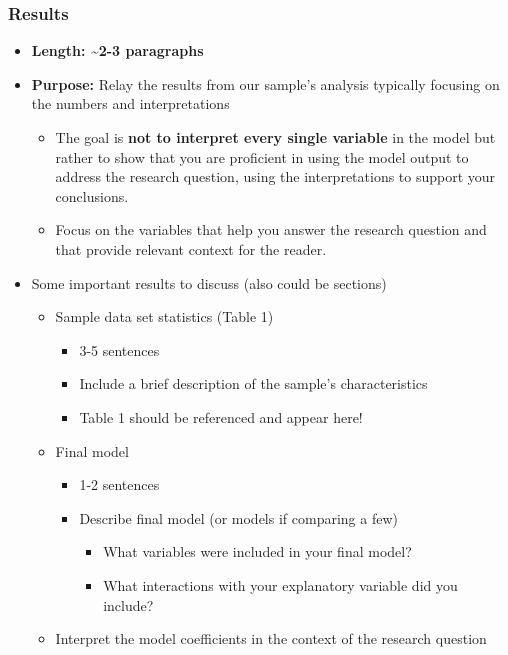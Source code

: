 \documentclass[
  letterpaper,
  DIV=11,
  numbers=noendperiod]{scrartcl}
\providecommand{\tightlist}{%
  \setlength{\itemsep}{0pt}\setlength{\parskip}{0pt}}\usepackage{longtable,booktabs,array}
\begin{document}
\subsubsection{Results}\label{results}

\begin{itemize}
\tightlist
\item
  \textbf{Length: \textasciitilde2-3 paragraphs}
\item
  \textbf{Purpose:} Relay the results from our sample's analysis
  typically focusing on the numbers and interpretations

  \begin{itemize}
  \tightlist
  \item
    The goal is \textbf{not to interpret every single variable} in the
    model but rather to show that you are proficient in using the model
    output to address the research question, using the interpretations
    to support your conclusions.
  \item
    Focus on the variables that help you answer the research question
    and that provide relevant context for the reader.
  \end{itemize}
\item
  Some important results to discuss (also could be sections)

  \begin{itemize}
  \tightlist
  \item
    Sample data set statistics (Table 1)

    \begin{itemize}
    \tightlist
    \item
      3-5 sentences
    \item
      Include a brief description of the sample's characteristics
    \item
      Table 1 should be referenced and appear here!
    \end{itemize}
  \item
    Final model

    \begin{itemize}
    \tightlist
    \item
      1-2 sentences
    \item
      Describe final model (or models if comparing a few)

      \begin{itemize}
      \tightlist
      \item
        What variables were included in your final model?
      \item
        What interactions with your explanatory variable did you
        include?
      \end{itemize}
    \end{itemize}
  \item
    Interpret the model coefficients in the context of the research
    question


\end{itemize}
\end{itemize}
\end{document}
